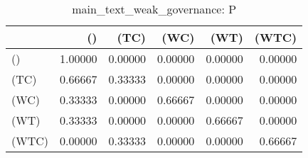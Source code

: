 \begin{table}
\centering
\caption{main_text_weak_governance: P}
\begin{tabular}{lrrrrr}
\toprule
{} &      () &    (TC) &    (WC) &    (WT) &   (WTC) \\
\midrule
()    & 1.00000 & 0.00000 & 0.00000 & 0.00000 & 0.00000 \\
(TC)  & 0.66667 & 0.33333 & 0.00000 & 0.00000 & 0.00000 \\
(WC)  & 0.33333 & 0.00000 & 0.66667 & 0.00000 & 0.00000 \\
(WT)  & 0.33333 & 0.00000 & 0.00000 & 0.66667 & 0.00000 \\
(WTC) & 0.00000 & 0.33333 & 0.00000 & 0.00000 & 0.66667 \\
\bottomrule
\end{tabular}
\end{table}
